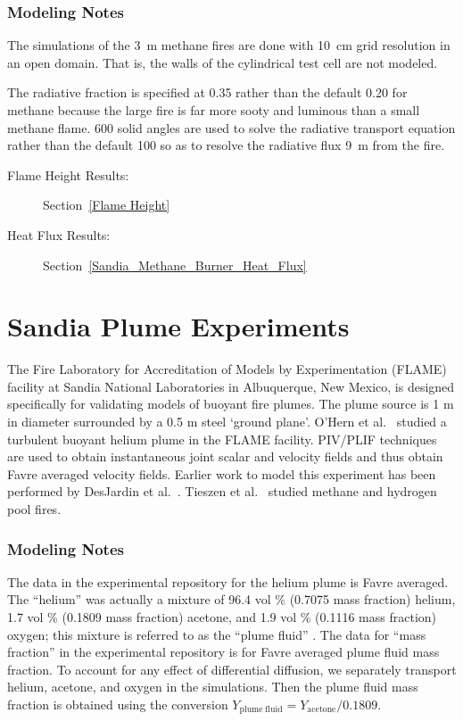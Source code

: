 \subsubsection{Modeling Notes}

The simulations of the 3~m methane fires are done with 10~cm grid resolution in an open domain. That is, the walls of the cylindrical test cell are not modeled. 

The radiative fraction is specified at 0.35 rather than the default 0.20 for methane because the large fire is far more sooty and luminous than a small methane flame. 600 solid angles are used to solve the radiative transport equation rather than the default 100 so as to resolve the radiative flux 9~m from the fire. 

\begin{description}
\item[Flame Height Results:] Section~\ref{Flame Height} 
\item[Heat Flux Results:] Section~\ref{Sandia_Methane_Burner_Heat_Flux} 
\end{description}

\FloatBarrier

\section{Sandia Plume Experiments}
\label{Sandia_Plume_Description}

The Fire Laboratory for Accreditation of Models by Experimentation (FLAME) facility \cite{OHern:2005,Blanchat:2001} at Sandia National Laboratories in Albuquerque, New Mexico, is designed specifically for validating models of buoyant fire plumes.  The plume source is 1 m in diameter surrounded by a 0.5 m steel `ground plane'.  O'Hern et al.~\cite{OHern:2005} studied a turbulent buoyant helium plume in the FLAME facility. PIV/PLIF techniques are used to obtain instantaneous joint scalar and velocity fields and thus obtain Favre averaged velocity fields. Earlier work to model this experiment has been performed by DesJardin et al.~\cite{DesJardin:2004}. Tieszen et al.~\cite{Tieszen:2004,Tieszen:2002} studied methane and hydrogen pool fires.

\subsubsection{Modeling Notes}

The data in the experimental repository for the helium plume is Favre averaged.  The ``helium'' was actually a mixture of 96.4 vol \% (0.7075 mass fraction) helium, 1.7 vol \% (0.1809 mass fraction) acetone, and 1.9 vol \% (0.1116 mass fraction) oxygen; this mixture is referred to as the ``plume fluid'' \cite{OHern:2005}.  The data for ``mass fraction'' in the experimental repository is for Favre averaged plume fluid mass fraction.  To account for any effect of differential diffusion, we separately transport helium, acetone, and oxygen in the simulations.  Then the plume fluid mass fraction is obtained using the conversion $Y_{\mathrm{plume\;fluid}} = Y_{\mathrm{acetone}}/0.1809$.

